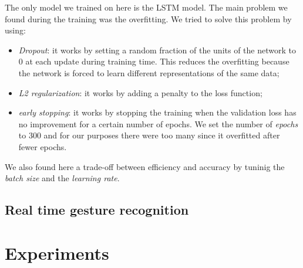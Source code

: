 \documentclass[10pt,twocolumn,letterpaper]{article}
\begin{document}
The only model we trained on here is the LSTM model. The main problem we found during the training 
was the overfitting. We tried to solve this problem by using:
\begin{itemize}
   \item \textit{Dropout}: it works by setting a random fraction of the units of the network to 0 
   at each update during training time. This reduces the overfitting 
   because the network is forced to learn different representations of the same data;
   \item \textit{L2 regularization}: it works by adding a penalty to the loss function;
   \item \textit{early stopping}: it works by stopping the training when the validation loss 
   has no improvement for a certain number of epochs. We set the number of \textit{epochs} to 
   300 and for our purposes there were too many since it overfitted after fewer epochs.
\end{itemize}
We also found here a trade-off between efficiency and accuracy by tuninig 
the \textit{batch size} and the \textit{learning rate}.





\subsection{Real time gesture recognition}

\section{Experiments}
\end{document}
